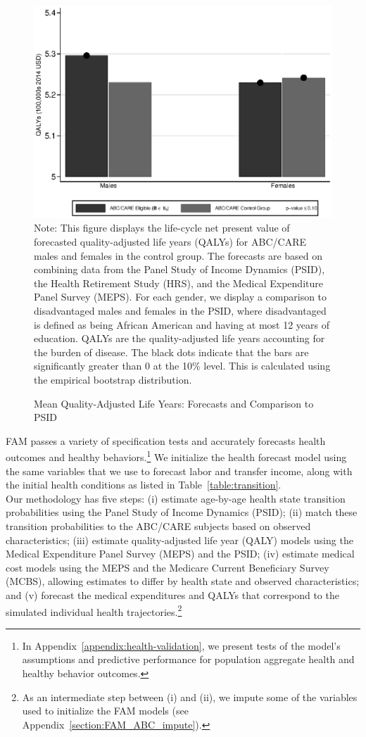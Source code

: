 \begin{figure}[!htbp]
\caption{Mean Quality-Adjusted Life Years: Forecasts and Comparison to PSID}\label{fig:qalys}
\centering
\includegraphics[width=.7\columnwidth]{output/qalyexppsid.eps}
\footnotesize \justify
Note:  This figure displays the life-cycle net present value of forecasted quality-adjusted life years (QALYs) for ABC/CARE males and females in the control group. The forecasts are based on combining data from the Panel Study of Income Dynamics (PSID), the Health Retirement Study (HRS), and the Medical Expenditure Panel Survey (MEPS). For each gender, we display a comparison to disadvantaged males and females in the PSID, where disadvantaged is defined as being African American and having at most 12 years of education. QALYs are the quality-adjusted life years accounting for the burden of disease. The black dots indicate that the bars are significantly greater than 0 at the 10\% level. This is calculated using the empirical bootstrap distribution.
\end{figure}

\noindent FAM passes a variety of specification tests and accurately forecasts health outcomes and healthy behaviors.\footnote{In Appendix~\ref{appendix:health-validation}, we present tests of the model's assumptions and predictive performance for population aggregate health and healthy behavior outcomes.} We initialize the health forecast model using the same variables that we use to forecast labor and transfer income, along with the initial health conditions as listed in Table~\ref{table:transition}.\\

\noindent Our methodology has five steps: (i) estimate age-by-age health state transition probabilities using the Panel Study of Income Dynamics (PSID); (ii) match these transition probabilities to the ABC/CARE subjects based on observed characteristics; (iii) estimate quality-adjusted life year (QALY) models using the Medical Expenditure Panel Survey (MEPS) and the PSID; (iv) estimate medical cost models using the MEPS and the Medicare Current Beneficiary Survey (MCBS), allowing estimates to differ by health state and observed characteristics; and (v) forecast the medical expenditures and QALYs that correspond to the simulated individual health trajectories.\footnote{As an intermediate step between (i) and (ii), we impute some of the variables used to initialize the FAM models (see  Appendix~\ref{section:FAM_ABC_impute}).}\\

